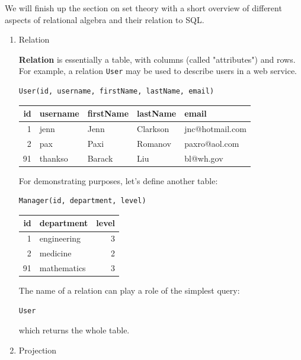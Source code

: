 \documentclass[a4paper, justified, notitlepage, sfsidenotes, notoc]{tufte-book}
\begin{document}
We will finish up the section on set theory with a short overview of different aspects of relational algebra and their relation to SQL.

\begin{enumerate}
\item Relation
\label{sec:org05f18b3}

\textbf{\textbf{Relation}} is essentially a table, with columns (called "attributes") and rows. For example, a relation \texttt{User} may be used to describe users in a web service.

\begin{verbatim}
User(id, username, firstName, lastName, email)
\end{verbatim}

\begin{center}
\begin{tabular}{rllll}
id & username & firstName & lastName & email\\
\hline
1 & jenn & Jenn & Clarkson & jnc@hotmail.com\\
2 & pax & Paxi & Romanov & paxro@aol.com\\
91 & thankso & Barack & Liu & bl@wh.gov\\
\end{tabular}
\end{center}

For demonstrating purposes, let's define another table:

\begin{verbatim}
Manager(id, department, level)
\end{verbatim}

\begin{center}
\begin{tabular}{rlr}
id & department & level\\
\hline
1 & engineering & 3\\
2 & medicine & 2\\
91 & mathematics & 3\\
\end{tabular}
\end{center}

The name of a relation can play a role of the simplest query:

\begin{verbatim}
User
\end{verbatim}

which returns the whole table.

\item Projection
\label{sec:org4a320aa}


\end{enumerate}
\end{document}
